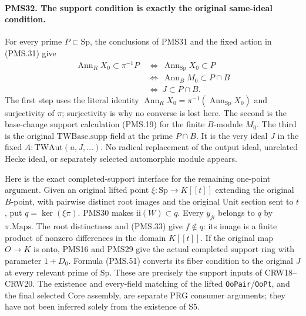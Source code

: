 \paragraph{PMS32. The support condition is exactly the original same-ideal condition.}
\label{claim:PMS32}
For every prime $P\subset\mathrm{Sp}$, the conclusions of
PMS31 and the fixed action in (PMS.31) give
\[
 \begin{split}
 \operatorname{Ann}_{R}X_0\subset\pi^{-1}P
 &\ \Longleftrightarrow\
 \operatorname{Ann}_{\mathrm{Sp}}X_0\subset P\\
 &\ \Longleftrightarrow\
 \operatorname{Ann}_{B}M_0\subset P\cap B\\
 &\ \Longleftrightarrow\ J\subset P\cap B .
 \end{split}                                             \tag{PMS.51}
\]
The first step uses the literal identity
$\operatorname{Ann}_R X_0=\pi^{-1}(\operatorname{Ann}_{\mathrm{Sp}}X_0)$
and surjectivity of $\pi$; surjectivity is why no converse is
lost here.  The second is the base-change support calculation
(PMS.19) for the finite $B$-module $M_0$.  The third is the
original $\mathrm{TWBase.supp}$ field at the prime $P\cap B$.
It is the very ideal $J$ in the fixed $A:\mathrm{TWAut}(u,J,\ldots)$.
No radical replacement of the output ideal, unrelated Hecke
ideal, or separately selected automorphic module appears.

Here is the exact completed-support interface for the remaining
one-point argument.  Given an original lifted point
$\xi:\mathrm{Sp}\to K[[t]]$ extending the original $B$-point,
with pairwise distinct root images and the original Unit
section sent to $t$, put $q=\ker(\xi\pi)$.
PMS30 makes $\mathrm{ii}(W)\subset q$.
Every $y_{ji}$ belongs to $q$ by $\pi.\mathrm{Maps}$.
The root distinctness and (PMS.33) give $f\notin q$:
its image is a finite product of nonzero differences in the
domain $K[[t]]$.
If the original map $O\to K$ is onto, PMS16 and PMS29 give
the actual completed support ring with parameter $1+D_0$.
Formula (PMS.51) converts its fiber condition to the original
$J$ at every relevant prime of $\mathrm{Sp}$.
These are precisely the support inputs of CRW18--CRW20.
The existence and every-field matching of the lifted
\texttt{OoPair}/\texttt{OoPt}, and the final selected Core
assembly, are separate PRG consumer arguments; they have
not been inferred solely from the existence of S5.

